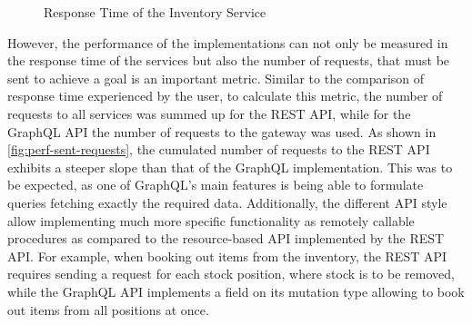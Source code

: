 \begin{figure}[b!]
    \centering
    \caption{Response Time of the Inventory Service}\label{fig:inventory-resp-time}    
\end{figure}

However, the performance of the implementations can not only be measured in the response time of the services but also the number of requests, that must be sent to achieve a goal is an important metric.
Similar to the comparison of response time experienced by the user, to calculate this metric, the number of requests to all services was summed up for the \ac{REST} \ac{API}, while for the GraphQL \ac{API} the number of requests to the gateway was used.
As shown in \autoref{fig:perf-sent-requests}, the cumulated number of requests to the \ac{REST} \ac{API} exhibits a steeper slope than that of the GraphQL implementation.
This was to be expected, as one of GraphQL's main features is being able to formulate queries fetching exactly the required data.
Additionally, the different \ac{API} style allow implementing much more specific functionality as remotely callable procedures as compared to the resource-based \ac{API} implemented by the \ac{REST} \ac{API}.
For example, when booking out items from the inventory, the \ac{REST} \ac{API} requires sending a request for each stock position, where stock is to be removed, while the GraphQL \ac{API} implements a field on its mutation type allowing to book out items from all positions at once.

